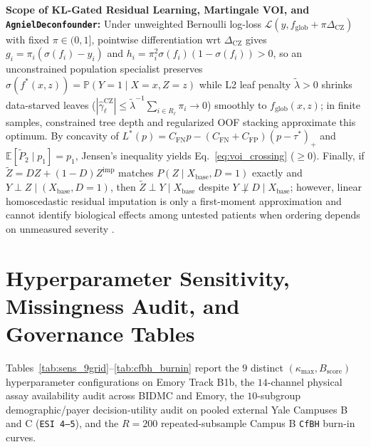 \documentclass[11pt]{article}
\begin{document}
\textbf{Scope of KL-Gated Residual Learning, Martingale VOI, and \texttt{AgnielDeconfounder}:} Under unweighted Bernoulli log-loss $\mathcal{L}(y, f_{\text{glob}}+\pi\Delta_{\text{CZ}})$ with fixed $\pi \in (0,1]$, pointwise differentiation wrt $\Delta_{\text{CZ}}$ gives $g_i = \pi_i(\sigma(f_i)-y_i)$ and $h_i = \pi_i^2\sigma(f_i)(1-\sigma(f_i)) > 0$, so an unconstrained population specialist preserves $\sigma(f^*(x,z))=\mathbb{P}(Y=1\mid X=x,Z=z)$ while L2 leaf penalty $\tilde{\lambda}>0$ shrinks data-starved leaves ($|\hat{\gamma}_\ell^{\text{CZ}}| \le \tilde{\lambda}^{-1}\sum_{i\in R_\ell}\pi_i \to 0$) smoothly to $f_{\text{glob}}(x,z)$; in finite samples, constrained tree depth and regularized OOF stacking approximate this optimum. By concavity of $L^*(p) = C_{\text{FN}}p - (C_{\text{FN}}+C_{\text{FP}})(p-\tau^*)_+$ and $\mathbb{E}[\tilde{P}_2\mid p_1]=p_1$, Jensen's inequality yields Eq.~\eqref{eq:voi_crossing} ($\ge 0$). Finally, if $\tilde{Z} = DZ + (1-D)Z^{\text{imp}}$ matches $P(Z\mid X_{\text{base}}, D=1)$ exactly and $Y \perp Z \mid (X_{\text{base}}, D=1)$, then $\tilde{Z} \perp Y \mid X_{\text{base}}$ despite $Y \not\perp D \mid X_{\text{base}}$; however, linear homoscedastic residual imputation is only a first-moment approximation and cannot identify biological effects among untested patients when ordering depends on unmeasured severity \citep{agniel2018biases,vonkleist2025evaluation}.

\section{Hyperparameter Sensitivity, Missingness Audit, and Governance Tables}
\label{app:sensitivity}
\label{app:horizons_shift}
\label{app:clinical_gov}

Tables~\ref{tab:sens_9grid}--\ref{tab:cfbh_burnin} report the $9$ distinct $(\kappa_{\max}, B_{\text{score}})$ hyperparameter configurations on Emory Track B1b, the $14$-channel physical assay availability audit across BIDMC and Emory, the $10$-subgroup demographic/payer decision-utility audit on pooled external Yale Campuses B and C (\texttt{ESI 4--5}), and the $R=200$ repeated-subsample Campus B \texttt{CfBH} burn-in curves.
\end{document}
